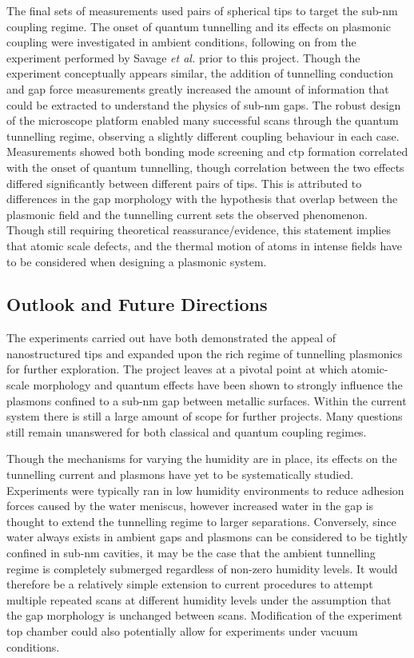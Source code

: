 \documentclass[12pt, a4paper, oneside]{book}
\begin{document}
The final sets of measurements used pairs of spherical tips to target the sub-nm coupling regime. The onset of quantum tunnelling and its effects on plasmonic coupling were investigated in ambient conditions, following on from the experiment performed by Savage \emph{et al.} \cite{savage2012} prior to this project. Though the experiment conceptually appears similar, the addition of tunnelling conduction and gap force measurements greatly increased the amount of information that could be extracted to understand the physics of sub-nm gaps. The robust design of the microscope platform enabled many successful scans through the quantum tunnelling regime, observing a slightly different coupling behaviour in each case. Measurements showed both bonding mode screening and \gls{ctp} formation correlated with the onset of quantum tunnelling, though correlation between the two effects differed significantly between different pairs of tips. This is attributed to differences in the gap morphology with the hypothesis that overlap between the plasmonic field and the tunnelling current sets the observed phenomenon. Though still requiring theoretical {\color{red}reassurance/evidence}, this statement implies that atomic scale defects, and the thermal motion of atoms in intense fields have to be considered when designing a plasmonic system.

\subsection{Outlook and Future Directions}

The experiments carried out have both demonstrated the appeal of nanostructured tips and expanded upon the rich regime of tunnelling plasmonics for further exploration. The project leaves at a pivotal point at which atomic-scale morphology and quantum effects have been shown to strongly influence the plasmons confined to a sub-nm gap between metallic surfaces. Within the current system there is still a large amount of scope for further projects. Many questions still remain unanswered for both classical and quantum coupling regimes.

Though the mechanisms for varying the humidity are in place, its effects on the tunnelling current and plasmons have yet to be systematically studied. Experiments were typically ran in low humidity environments to reduce adhesion forces caused by the water meniscus, however increased water in the gap is thought to extend the tunnelling regime to larger separations. Conversely, since water always exists in ambient gaps and plasmons can be considered to be tightly confined in sub-nm cavities, it may be the case that the ambient tunnelling regime is completely submerged regardless of non-zero humidity levels. It would therefore be a relatively simple extension to current procedures to attempt multiple repeated scans at different humidity levels under the assumption that the gap morphology is unchanged between scans. Modification of the experiment top chamber could also potentially allow for experiments under vacuum conditions.
\end{document}
